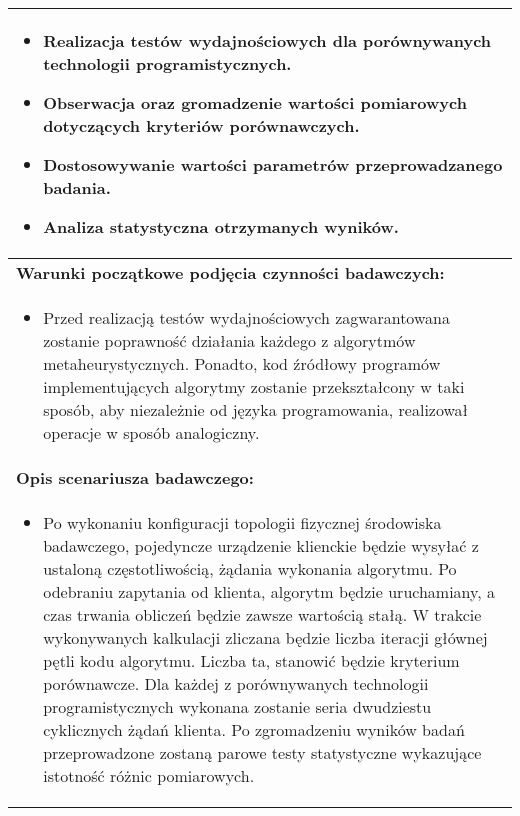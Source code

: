 \begin{longtable}[c]{|llll|}
    \multicolumn{4}{|p{\linewidth}|}{
        \begin{itemize}
            \item Realizacja testów wydajnościowych dla porównywanych technologii programistycznych.
            \item Obserwacja oraz gromadzenie wartości pomiarowych dotyczących kryteriów porównawczych.
            \item Dostosowywanie wartości parametrów przeprowadzanego badania.
            \item Analiza statystyczna otrzymanych wyników.
        \end{itemize}
    }                                                           \\ \hline
    \multicolumn{4}{|l|}{\textbf{Warunki początkowe podjęcia czynności badawczych:}} \\ \hline
    \multicolumn{4}{|p{\linewidth}|}{
        \begin{itemize}[label={}]
            \item Przed realizacją testów wydajnościowych zagwarantowana zostanie poprawność działania każdego z algorytmów metaheurystycznych. Ponadto, kod źródłowy programów implementujących algorytmy zostanie przekształcony w taki sposób, aby niezależnie od języka programowania, realizował operacje w sposób analogiczny. 
          \end{itemize}
    }                                                           \\ \hline
    \multicolumn{4}{|l|}{\textbf{Opis scenariusza badawczego:}}                      \\ \hline
    \multicolumn{4}{|p{\linewidth}|}{
        \begin{itemize}[label={}]
            \item Po wykonaniu konfiguracji topologii fizycznej środowiska badawczego, pojedyncze urządzenie klienckie będzie wysyłać z ustaloną częstotliwością, żądania wykonania algorytmu. Po odebraniu zapytania od klienta, algorytm będzie uruchamiany, a czas trwania obliczeń będzie zawsze wartością stałą. W trakcie wykonywanych kalkulacji zliczana będzie liczba iteracji głównej pętli kodu algorytmu. Liczba ta, stanowić będzie kryterium porównawcze. Dla każdej z porównywanych technologii programistycznych wykonana zostanie seria dwudziestu cyklicznych żądań klienta. Po zgromadzeniu wyników badań przeprowadzone zostaną parowe testy statystyczne wykazujące istotność różnic pomiarowych.
          \end{itemize}
}
\end{longtable}
